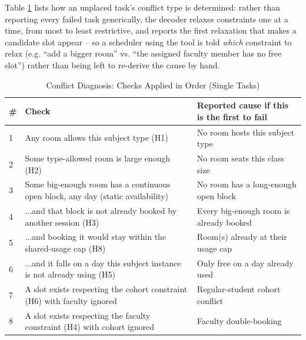 \documentclass[conference]{IEEEtran}
\begin{document}
Table \ref{tab:diagnostics} lists how an unplaced task's conflict type is determined: rather than reporting every failed task generically, the decoder relaxes constraints one at a time, from most to least restrictive, and reports the first relaxation that makes a candidate slot appear -- so a scheduler using the tool is told \emph{which} constraint to relax (e.g. ``add a bigger room'' vs. ``the assigned faculty member has no free slot'') rather than being left to re-derive the cause by hand.

\begin{table}[t]
\caption{Conflict Diagnosis: Checks Applied in Order (Single Tasks)}
\label{tab:diagnostics}
\centering
\footnotesize
\begin{tabular}{p{0.6cm}p{3.5cm}p{3.0cm}}
\toprule
\# & Check & Reported cause if this is the first to fail \\
\midrule
1 & Any room allows this subject type (H1) & No room hosts this subject type \\
2 & Some type-allowed room is large enough (H2) & No room seats this class size \\
3 & Some big-enough room has a continuous open block, any day (static availability) & No room has a long-enough open block \\
4 & ...and that block is not already booked by another session (H3) & Every big-enough room is already booked \\
5 & ...and booking it would stay within the shared-usage cap (H8) & Room(s) already at their usage cap \\
6 & ...and it falls on a day this subject instance is not already using (H5) & Only free on a day already used \\
7 & A slot exists respecting the cohort constraint (H6) with faculty ignored & Regular-student cohort conflict \\
8 & A slot exists respecting the faculty constraint (H4) with cohort ignored & Faculty double-booking \\
\bottomrule
\end{tabular}
\end{table}
\end{document}
